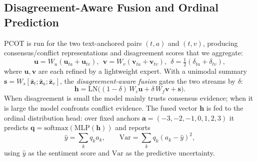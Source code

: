 \documentclass[conference]{IEEEtran}
\begin{document}
\subsection{Disagreement-Aware Fusion and Ordinal Prediction}
PCOT is run for the two text-anchored pairs $(t,a)$ and $(t,v)$, producing
consensus/conflict representations and disagreement scores that we aggregate:
\begin{equation}
\mathbf{u} = W_u(\mathbf{u}_{ta}+\mathbf{u}_{tv}),\ \
\mathbf{v} = W_v(\mathbf{v}_{ta}+\mathbf{v}_{tv}),\ \
\delta = \tfrac{1}{2}(\delta_{ta}+\delta_{tv}),
\end{equation}
where $\mathbf{u},\mathbf{v}$ are each refined by a lightweight expert. With a
unimodal summary $\mathbf{s} = W_s[\bar{\mathbf{z}}_t;\bar{\mathbf{z}}_a;\bar{\mathbf{z}}_v]$,
the \emph{disagreement-aware fusion} gates the two streams by $\delta$:
\begin{equation}
\mathbf{h} = \mathrm{LN}\!\big((1-\delta)\,W_c\mathbf{u} + \delta\,W_f\mathbf{v} + \mathbf{s}\big).
\end{equation}
When disagreement is small the model mainly trusts consensus evidence; when it is
large the model confronts conflict evidence. The fused vector $\mathbf{h}$ is fed to
the ordinal distribution head: over fixed anchors $\bm{a}=(-3,-2,-1,0,1,2,3)$ it
predicts $\bm{q}=\mathrm{softmax}(\mathrm{MLP}(\mathbf{h}))$ and reports
\begin{equation}
\hat{y} = \sum_k q_k a_k, \qquad
\mathrm{Var} = \sum_k q_k (a_k - \hat{y})^2,
\end{equation}
using $\hat{y}$ as the sentiment score and $\mathrm{Var}$ as the predictive
uncertainty.
\end{document}
